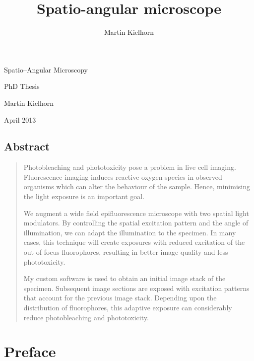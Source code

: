 \documentclass[oneside,a4paper,12pt,BCOR20mm,DIV14]{scrbook} %
\title{Spatio-angular microscope} %
\author{Martin Kielhorn}
\def\svgending{\ifx\pdfoutput\undefined%
  .eps_tex%
  \else%
  .pdf_tex%
  \fi}
\newcommand{\svginput}[2]{{\def\svgscale{#1}}}
\newenvironment{summary}{\begin{quote}\small}{\end{quote}}
\begin{document}
\listoftodos
\begin{titlepage}
  
  \hspace{-4cm}
  \svginput{1}{objective-trace}



  \vspace{-5cm}
  
  \hspace{4cm}\textsf{\Huge Spatio--Angular Microscopy}
  
  \vspace{2cm}
  \hspace{6cm}\textsf{\huge PhD Thesis}


  \vspace{3cm}
  \hspace{4cm}\textsf{\Large Martin Kielhorn}
  
  \vspace{1cm}
  \hspace{4cm}\textsf{\Large April 2013}
\end{titlepage}
\newpage
\section*{Abstract}
\begin{summary}
  Photobleaching and phototoxicity pose a problem in live cell
  imaging. Fluorescence imaging induces reactive oxygen species in
  observed organisms which can alter the behaviour of the
  sample. Hence, minimising the light exposure is an important goal.

  We augment a wide field epifluorescence microscope with two spatial
  light modulators. By controlling the spatial excitation pattern and
  the angle of illumination, we can adapt the illumination to the
  specimen. In many cases, this technique will create exposures with
  reduced excitation of the out-of-focus fluorophores, resulting in
  better image quality and less phototoxicity.

  My custom software is used to obtain an initial image stack of the
  specimen. Subsequent image sections are exposed with excitation
  patterns that account for the previous image stack. Depending
  upon the distribution of fluorophores, this adaptive exposure can
  considerably reduce photobleaching and phototoxicity.
\end{summary}


\chapter*{Preface}
\end{document}
